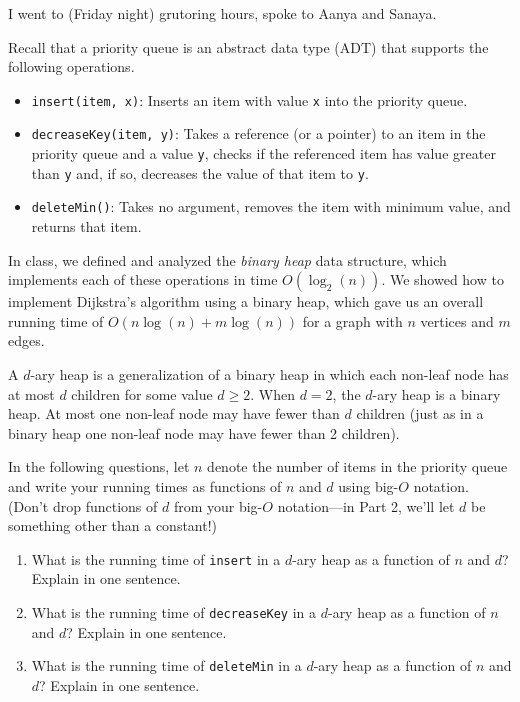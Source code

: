 \documentclass[12 pt, letterpaper]{hmcpset}
\begin{document}
I went to (Friday night) grutoring hours, spoke to Aanya and Sanaya.

\begin{problem}
	Recall that a priority queue is an abstract data type (ADT) that supports the following operations. 
\begin{itemize}
    \item \verb+insert(item, x)+:  Inserts an item with value \verb+x+ into the priority queue.
    \item \verb+decreaseKey(item, y)+:  Takes a reference (or a pointer) to an item in the priority queue and a value \verb+y+, checks if the referenced item has value greater than \verb+y+ and, if so, decreases the value of that item to \verb+y+.  
    \item \verb+deleteMin()+: Takes no argument, removes the item with minimum value, and returns that item.
\end{itemize}

In class, we defined and analyzed the \emph{binary heap} data structure, which implements each of these operations in time $O(\log_2(n))$. We showed how to implement Dijkstra's algorithm using a binary heap, which gave us an overall running time of $O(n \log(n) + m \log(n))$ for a graph with $n$ vertices and $m$ edges.

A $d$-ary heap is a generalization of a binary heap in which each non-leaf node has at most $d$ children for some value $d \geq 2$.  When $d = 2$, the $d$-ary heap is a binary heap.   At most one non-leaf node may have fewer than $d$ children (just as in a binary heap one non-leaf node may have fewer than 2 children).

In the following questions, let $n$ denote the number of items in the priority queue and write your running times as functions of $n$ and $d$ using big-$O$ notation.
(Don't drop functions of $d$ from your big-$O$ notation---in Part 2, we'll let $d$ be something other than a constant!)

\begin{enumerate}
    \item  What is the running time of \verb+insert+ in a $d$-ary heap as a function of $n$ and $d$?  Explain in one sentence.
    
    \item What is the running time of  \verb+decreaseKey+ in a $d$-ary heap as a function of $n$ and $d$?  Explain in one sentence.
                        
    \item What is the running time of  \verb+deleteMin+  in a $d$-ary heap as a function of $n$ and $d$?  Explain in one sentence.
\end{enumerate}
\end{problem}
\end{document}
